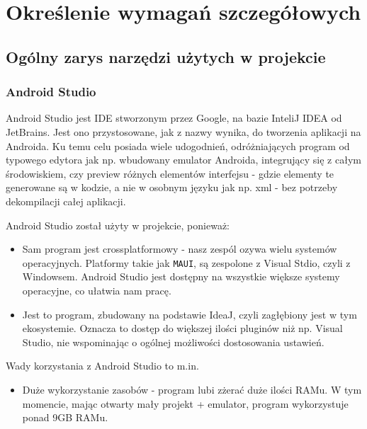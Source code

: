 \newpage
\section{Określenie wymagań szczegółowych}		%

\subsection{Ogólny zarys narzędzi użytych w projekcie}

\subsubsection{Android Studio}

Android Studio jest IDE stworzonym przez Google, na bazie InteliJ IDEA od JetBrains. Jest ono przystosowane, jak z nazwy wynika, do tworzenia aplikacji na Androida. Ku temu celu posiada wiele udogodnień, odróżniających program od typowego edytora jak np. wbudowany emulator Androida, integrujący się z całym środowiskiem, czy preview różnych elementów interfejsu - gdzie elementy te generowane są w kodzie, a nie w osobnym języku jak np. xml - bez potrzeby dekompilacji całej aplikacji. 

Android Studio został użyty w projekcie, ponieważ:

\begin{itemize}
	\item Sam program jest crossplatformowy - nasz zespól ozywa wielu systemów operacyjnych. Platformy takie jak \texttt{MAUI}, są zespolone z Visual Stdio, czyli z Windowsem. Android Studio jest dostępny na wszystkie większe systemy operacyjne, co ułatwia nam pracę.
	\item Jest to program, zbudowany na podstawie IdeaJ, czyli zagłębiony jest w tym ekosystemie. Oznacza to dostęp do większej ilości pluginów niż np. Visual Studio, nie wspominając o ogólnej możliwości dostosowania ustawień.
\end{itemize}

Wady korzystania z Android Studio to m.in.

\begin{itemize}
	\item Duże wykorzystanie zasobów - program lubi zżerać duże ilości RAMu. W tym momencie, mając otwarty mały projekt + emulator, program wykorzystuje ponad 9GB RAMu. 
\end{itemize}

